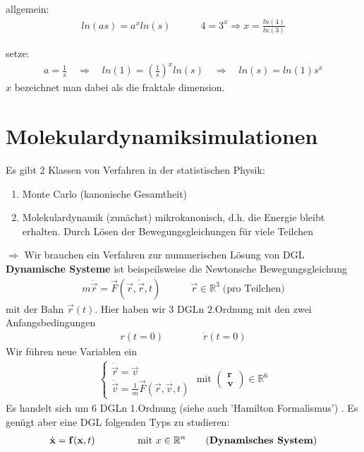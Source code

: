 \documentclass[12pt]{article}
\begin{document}
allgemein: \begin{align*}
ln(as)= a^x ln(s) \quad \quad \quad   4=3^x \Rightarrow x= \frac{ln(4)}{ln(3)}
\end{align*}


setze:\begin{align*}
a= \frac{1}{s} \quad \Rightarrow \quad ln(1)= \left( \frac{1}{s} \right)^x ln(s) \quad \Rightarrow \quad ln(s)= ln(1) s^x
\end{align*} 
$x$ bezeichnet man dabei als die fraktale dimension.

\section{Molekulardynamiksimulationen}
Es gibt 2 Klassen von Verfahren in der statistischen Physik: 
\begin{enumerate}
\item Monte Carlo (kanonische Gesamtheit)
\item Molekulardynamik (zunächst) mikrokanonisch, d.h. die Energie bleibt erhalten. Durch Lösen der Bewegungsgleichungen für viele Teilchen \\
\end{enumerate}
$\Rightarrow$ Wir brauchen ein Verfahren zur nummerischen Lösung von DGL \\
\textbf{Dynamische Systeme} 
ist beispeilsweise die Newtonsche Bewegungsgleichung 
\begin{align}
m \ddot{\vec{r}} = \vec{F} (\vec{r}, \dot{\vec{r}}, t) \quad \quad \quad \vec{r} \in \mathbb{R}^3 \; \text{(pro Teilchen)}
\end{align} mit der Bahn $\vec{r}(t)$. Hier haben wir 3 DGLn $2.$Ordnung mit den zwei Anfangsbedingungen
\begin{align*}
r(t=0) \quad \quad  \quad \quad \dot{r}(t=0)
\end{align*}
Wir führen neue Variablen ein 
\begin{align*}
\begin{cases}
\dot{\vec{r}}= \vec{v} \\
\dot{\vec{v}} = \frac{1}{m} \vec{F}(\vec{r}, \vec{v},t) 
\end{cases}
\text{ mit }
\begin{pmatrix}\mathbf{r}\\ \mathbf{v}\end{pmatrix} \in \mathbb{R}^6
\end{align*}
Es handelt sich um 6 DGLn 1.Ordnung (siehe auch 'Hamilton Formalismus') %
. Es genügt aber eine DGL folgenden Typs zu studieren: 
\begin{align}
\dot{\mathbf{x}}= \mathbf{f}( \mathbf{x},t) \quad \quad \quad \quad \mbox{  mit  } x \in \mathbb{R}^n \tag{\textbf{Dynamisches System}}
\end{align}
\end{document}

